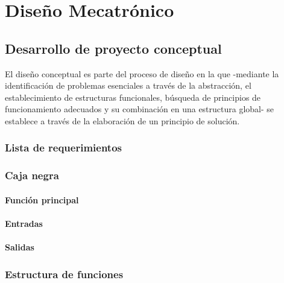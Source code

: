 
\doublespacing
\chapter{Diseño Mecatrónico}

\section{Desarrollo de proyecto conceptual}

El diseño conceptual es parte del proceso de diseño en la que -mediante la identificación de problemas esenciales a través de la abstracción, el establecimiento de estructuras funcionales, búsqueda de principios de funcionamiento adecuados y su combinación en una estructura global- se establece a través de la elaboración de un principio de solución.\cite[p.~159]{Pahl2007}

\subsection{Lista de requerimientos}

\subsection{Caja negra}

\subsubsection{Función principal}

\subsubsection{Entradas}

\subsubsection{Salidas}

\subsection{Estructura de funciones}

